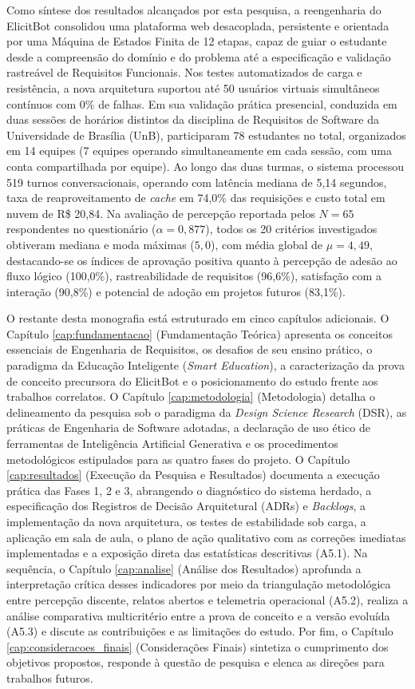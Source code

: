 Como síntese dos resultados alcançados por esta pesquisa, a reengenharia do ElicitBot consolidou uma plataforma web desacoplada, persistente e orientada por uma Máquina de Estados Finita de 12 etapas, capaz de guiar o estudante desde a compreensão do domínio e do problema até a especificação e validação rastreável de Requisitos Funcionais. Nos testes automatizados de carga e resistência, a nova arquitetura suportou até 50 usuários virtuais simultâneos contínuos com 0\% de falhas. Em sua validação prática presencial, conduzida em duas sessões de horários distintos da disciplina de Requisitos de Software da Universidade de Brasília (UnB), participaram 78 estudantes no total, organizados em 14 equipes (7 equipes operando simultaneamente em cada sessão, com uma conta compartilhada por equipe). Ao longo das duas turmas, o sistema processou 519 turnos conversacionais, operando com latência mediana de 5,14 segundos, taxa de reaproveitamento de \textit{cache} em 74,0\% das requisições e custo total em nuvem de R\$ 20,84. Na avaliação de percepção reportada pelos $N = 65$ respondentes no questionário ($\alpha = 0,877$), todos os 20 critérios investigados obtiveram mediana e moda máximas ($5,0$), com média global de $\mu = 4,49$, destacando-se os índices de aprovação positiva quanto à percepção de adesão ao fluxo lógico (100,0\%), rastreabilidade de requisitos (96,6\%), satisfação com a interação (90,8\%) e potencial de adoção em projetos futuros (83,1\%).

O restante desta monografia está estruturado em cinco capítulos adicionais. O Capítulo \ref{cap:fundamentacao} (Fundamentação Teórica) apresenta os conceitos essenciais de Engenharia de Requisitos, os desafios de seu ensino prático, o paradigma da Educação Inteligente (\textit{Smart Education}), a caracterização da prova de conceito precursora do ElicitBot e o posicionamento do estudo frente aos trabalhos correlatos. O Capítulo \ref{cap:metodologia} (Metodologia) detalha o delineamento da pesquisa sob o paradigma da \textit{Design Science Research} (DSR), as práticas de Engenharia de Software adotadas, a declaração de uso ético de ferramentas de Inteligência Artificial Generativa e os procedimentos metodológicos estipulados para as quatro fases do projeto. O Capítulo \ref{cap:resultados} (Execução da Pesquisa e Resultados) documenta a execução prática das Fases 1, 2 e 3, abrangendo o diagnóstico do sistema herdado, a especificação dos Registros de Decisão Arquitetural (ADRs) e \textit{Backlogs}, a implementação da nova arquitetura, os testes de estabilidade sob carga, a aplicação em sala de aula, o plano de ação qualitativo com as correções imediatas implementadas e a exposição direta das estatísticas descritivas (A5.1). Na sequência, o Capítulo \ref{cap:analise} (Análise dos Resultados) aprofunda a interpretação crítica desses indicadores por meio da triangulação metodológica entre percepção discente, relatos abertos e telemetria operacional (A5.2), realiza a análise comparativa multicritério entre a prova de conceito e a versão evoluída (A5.3) e discute as contribuições e as limitações do estudo. Por fim, o Capítulo \ref{cap:consideracoes_finais} (Considerações Finais) sintetiza o cumprimento dos objetivos propostos, responde à questão de pesquisa e elenca as direções para trabalhos futuros.